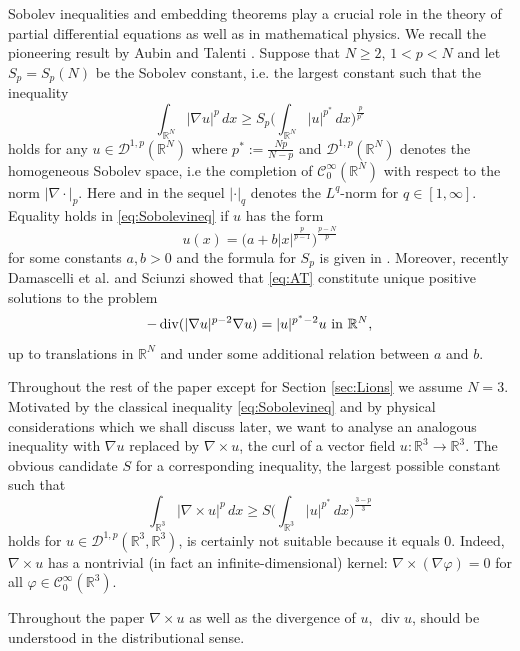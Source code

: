 \documentclass[12pt,leqno,twoside]{amsart}
\newcommand{\vp}{\varphi}
\def\div{\mathop{\mathrm{div}}}
\def\R{\mathbb{R}}
\newcommand{\cC}{{\mathcal C}}
\newcommand{\cD}{{\mathcal D}}
\newcommand{\cDp}{\cD^{1,p}(\R^3,\R^3)}
\def\r{\mathbb{R}}
\def\r3{\mathbb{R}^3}
\def\vp{\varphi}
\def\curlop{\nabla\times}
\numberwithin{equation}{section}
\begin{document}
Sobolev inequalities and embedding theorems play a crucial role in the theory of partial differential equations as well as in mathematical physics. 
We recall the pioneering result by Aubin \cite{Aubin} and Talenti  \cite{Talenti}.
Suppose that $N\geq 2$, $1<p<N$ and let $S_p=S_p(N)$ be the Sobolev constant, i.e. the largest constant such that the inequality
\begin{equation}\label{eq:Sobolevineq}
	\int_{\R^N}|\nabla u|^p\, dx\geq S_p\Big(\int_{\R^N}|u|^{p^*}\,dx\Big)^{\frac{p}{p^*}}
\end{equation}
holds for any $u\in \cD^{1,p}(\R^N)$ where $p^*:=\frac{Np}{N-p}$ and $\cD^{1,p}(\R^N)$ denotes the homogeneous Sobolev space, i.e  the completion of $\cC^{\infty}_0(\R^N)$ with respect to the norm  $|\nabla \cdot|_{p}$. Here and in the sequel $|\cdot|_q$ denotes the $L^q$-norm for $q\in[1,\infty]$.  Equality holds in \eqref{eq:Sobolevineq} if $u$ has the form
\begin{equation}\label{eq:AT}
u(x)=\big(a+b|x|^{\frac{p}{p-1}}\big)^{\frac{p-N}{p}}
\end{equation}
for some constants $a,b>0$ and the formula for $S_p$ is given in \cite{Talenti}.  Moreover, recently  Damascelli et al. \cite{SciunziAiM2014} and Sciunzi \cite{SciunziAiM2016} showed  that \eqref{eq:AT} constitute unique positive solutions to the problem
\begin{equation}\label{eq:plap}
-\div(|\nabla u|^{p-2}\nabla u)=|u|^{p^*-2}u\hbox{ in }\R^N,
\end{equation}
up to translations in $\R^N$ and under some additional relation between $a$ and $b$.

Throughout the rest of the paper except for Section \ref{sec:Lions} we assume $N=3$.  Motivated
 by the classical inequality \eqref{eq:Sobolevineq} and by physical considerations which we shall discuss later, we want to analyse an analogous inequality  with  $\nabla u$ replaced by $\curlop u$, the curl of a vector field $u:\R^3\to\R^3$. The obvious candidate $S$ for a corresponding inequality, the largest possible constant such that 
$$
\int_{\r3}|\curlop u|^p\, dx\geq S\Big(\int_{\r3}|u|^{p^*}\,dx\Big)^{\frac{3-p}{3}}
$$ 
holds for $u\in\cDp$, is certainly not suitable because it equals $0$. Indeed, $\curlop u $ has a  nontrivial (in fact an infinite-dimensional) kernel: $\curlop (\nabla\vp)=0$ for all $\vp\in\cC_0^{\infty}(\R^3)$. 

Throughout the paper $\curlop u$ as well as the divergence of $u$, $\div u$, should be understood in the distributional sense.
\end{document}
